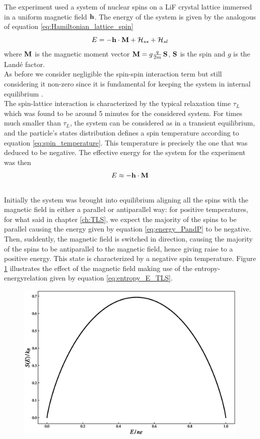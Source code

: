 The experiment used a system of nuclear spins on a LiF crystal lattice immersed in a uniform magnetic field $\mathbf{h}$.
The energy of the system is given by the analogous of equation \ref{eq:Hamiltonian_lattice_spin}
\begin{equation*}
    E = - \mathbf{h} \cdot \mathbf{M} + \mathcal{H}_{ss} + \mathcal{H}_{sl}
\end{equation*}
where $\mathbf{M}$ is the magnetic moment vector $\mathbf{M} = g \frac{q}{2m} \, \mathbf{S}$, $\mathbf{S}$ is the spin and $g$ is the Landé factor. \\
As before we consider negligible the spin-spin interaction term but still considering it non-zero since it is fundamental for keeping the system in internal equilibrium \cite{main_article}. \\
The spin-lattice interaction is characterized by the typical relaxation time $\tau_{L}$ which was found to be around 5 minutes for the considered system. For times much smaller than $\tau_L$, 
the system can be considered as in a transient equilibrium, and the particle's states distribution defines a spin temperature according to equation \ref{eq:spin_temperature}. This temperature is precisely the one
that was deduced to be negative. The effective energy for the system for the experiment was then 
\begin{equation}
    E \approx - \mathbf{h} \cdot \mathbf{M}
    \label{eq:energy_PandP}
\end{equation}\\
Initially the system was brought into equilibrium aligning all the spins with the magnetic field in either a parallel or antiparallel way: for positive temperatures, for what said in chapter \ref{ch:TLS}, we expect the majority of the spins to be parallel causing the energy given by 
equation \ref{eq:energy_PandP} to be negative. \\
Then, suddently, the magnetic field is switched in direction, causing the majority of the spins to be antiparallel to the magnetic field, hence giving raise to a positive energy. This state is characterized by a negative spin temperature.
Figure \ref{fig:PandP_switch} illustrates the effect of the magnetic field making use of the entropy-energyrelation given by equation \ref{eq:entropy_E_TLS}.
\begin{figure}
    \centering 
    \includegraphics[scale=0.5]{./images/entropy_TLS}
    \caption{}
    \label{fig:PandP_switch}
\end{figure}

